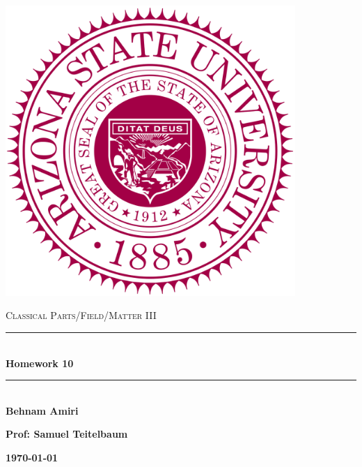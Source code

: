 \documentclass[fleqn]{article}
\begin{document}
  \begin{titlepage}

    \newcommand{\HRule}{\rule{\linewidth}{0.5mm}}

    \center

    \begin{center}
      \includegraphics[height=11cm, width=11cm]{asu.png}
    \end{center}

    \vline

    \textsc{\LARGE Classical Parts/Field/Matter III}\\[1.5cm]

    \HRule \\[0.5cm]
    { \huge \bfseries Homework 10}\\[0.4cm] 
    \HRule \\[1.0cm]

    \textbf{Behnam Amiri}

    \bigbreak

    \textbf{Prof: Samuel Teitelbaum}

    \bigbreak

    \textbf{{\large \today}\\[2cm]}

    \vfill

  \end{titlepage}
\end{document}

